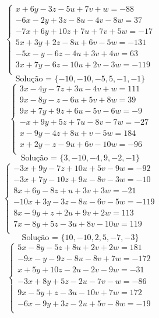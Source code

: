 \documentclass[12pt,oneside,a4paper]{article}
\begin{document}
\vspace{\baselineskip}
\begin{equation*}
\begin{cases}
x+6y-3z-5u+7v+w=-88 \\
-6x-2y+3z-8u-4v-8w=37 \\
-7x+6y+10z+7u+7v+5w=-17 \\
5x+3y+2z-8u+6v-5w=-131 \\
-5x-y-6z-4u+3v+4w=63 \\
3x+7y-6z-10u+2v-3w=-119 \\
\end{cases}
\end{equation*}
\begin{equation*}
\text{Solução = }\{-10,-10,-5,5,-1,-1\}
\end{equation*}
\vspace{\baselineskip}
\begin{equation*}
\begin{cases}
3x-4y-7z+3u-4v+w=111 \\
9x-8y-z-6u+5v+8w=39 \\
9x+7y+9z+6u-5v-6w=-9 \\
-x+9y+5z+7u-8v-7w=-27 \\
x-9y-4z+8u+v-5w=184 \\
x+2y-z-9u+6v-10w=-96 \\
\end{cases}
\end{equation*}
\begin{equation*}
\text{Solução = }\{3,-10,-4,9,-2,-1\}
\end{equation*}
\vspace{\baselineskip}
\begin{equation*}
\begin{cases}
-3x+9y-7z+10u+5v-9w=-92 \\
-3x+7y-10z+9u-8v-3w=-10 \\
8x+6y-8z+u+3v+3w=-21 \\
-10x+3y-3z-8u-6v-5w=-119 \\
8x-9y+z+2u+9v+2w=113 \\
7x-8y+5z-3u+8v-10w=119 \\
\end{cases}
\end{equation*}
\begin{equation*}
\text{Solução = }\{10,-10,2,5,-7,-3\}
\end{equation*}
\vspace{\baselineskip}
\begin{equation*}
\begin{cases}
5x-8y-5z+8u+2v+2w=181 \\
-9x-y-9z-8u-8v+7w=-172 \\
x+5y+10z-2u-2v-9w=-31 \\
-3x+8y+5z-2u-7v-w=-86 \\
9x-5y+z-3u-10v+7w=172 \\
-6x-9y+3z-2u+5v-8w=-19 \\
\end{cases}
\end{equation*}
\end{document}
